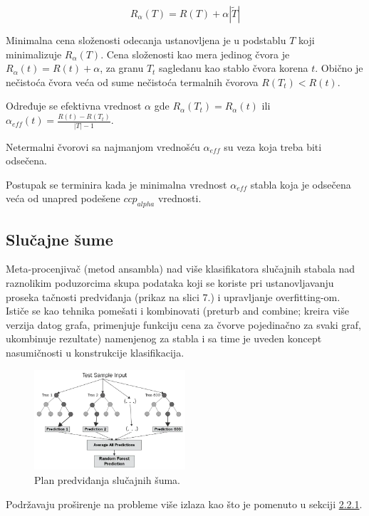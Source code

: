 \documentclass[fontsize=12bp, paper=a4]{scrarticle}
\begin{document}
$$R_\alpha(T) = R(T) + \alpha|\widetilde{T}|$$

Minimalna cena složenosti odecanja ustanovljena je u podstablu $T$ koji minimalizuje $R_\alpha(T)$. 
Cena složenosti kao mera jedinog čvora je $R_\alpha(t)=R(t)+\alpha$, za granu $T_t$ sagledanu kao stablo čvora korena $t$. Obično je nečistoća čvora veća od sume nečistoća termalnih čvorova $R(T_t)<R(t)$.

Određuje se efektivna vrednost $\alpha$ gde $R_\alpha(T_t)=R_\alpha(t)$ ili $\alpha_{eff}(t)=\frac{R(t)-R(T_t)}{|T|-1}$.


Netermalni čvorovi sa najmanjom vrednošću $\alpha_{eff}$ su veza koja treba biti odsečena.


Postupak se terminira kada je minimalna vrednost $\alpha_{eff}$ stabla koja je odsečena veća od unapred podešene $ccp_{alpha}$ vrednosti\cite{ccpalpha}.

\newpage

\subsection{Slučajne šume\cite{ensamblerf}}
Meta-procenjivač (metod ansambla) nad više klasifikatora slučajnih stabala nad raznolikim poduzorcima skupa podataka koji se koriste pri ustanovljavanju proseka tačnosti predviđanja (prikaz na slici 7.) i upravljanje overfitting-om.\cite{rf} Ističe se kao tehnika pomešati i kombinovati (preturb and combine; kreira više verzija datog grafa, primenjuje funkciju cena za čvorve pojedinačno za svaki graf, ukombinuje rezultate\cite{pnc}) namenjenog za stabla i sa time je uveden koncept nasumičnosti u konstrukcije klasifikacija. 

\begin{figure}[h!]
    \centering
    \includegraphics[width=0.5\textwidth]{image-6.png}
    \caption{Plan predviđanja slučajnih šuma.}
\end{figure}

Podržavaju proširenje na probleme više izlaza kao što je pomenuto u sekciji \hyperref[sec:mop]{2.2.1}.
\end{document}
